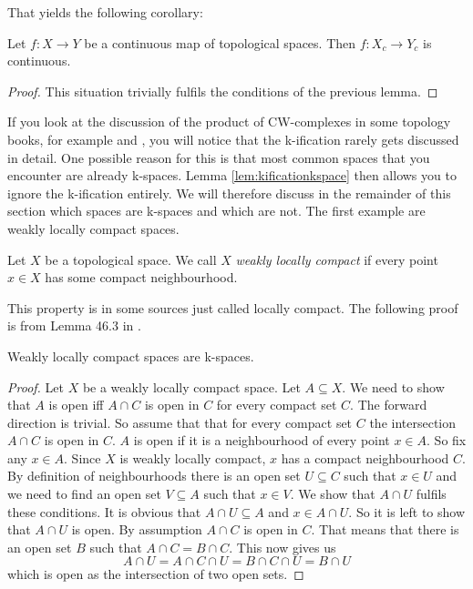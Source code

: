 That yields the following corollary: 

\begin{cor}
    Let $f \colon X \to Y$ be a continuous map of topological spaces.
    Then $f \colon X_c \to Y_c$ is continuous.
\end{cor}
\begin{proof}
    This situation trivially fulfils the conditions of the previous lemma.
\end{proof}

If you look at the discussion of the product of CW-complexes in some topology books, for example \cite{Hatcher2001} and \cite{Lück2005}, you will notice that the k-ification rarely gets discussed in detail. 
One possible reason for this is that most common spaces that you encounter are already k-spaces.
Lemma \ref{lem:kificationkspace} then allows you to ignore the k-ification entirely. 
We will therefore discuss in the remainder of this section which spaces are k-spaces and which are not.
The first example are weakly locally compact spaces.

\begin{defi}
    Let $X$ be a topological space.
    We call $X$ \emph{weakly locally compact} if every point $x \in X$ has some compact neighbourhood.
\end{defi}

This property is in some sources just called locally compact.
The following proof is from Lemma 46.3 in \cite{Munkres2014}.

\begin{lem}
    Weakly locally compact spaces are k-spaces.
\end{lem}
\begin{proof}
    Let $X$ be a weakly locally compact space. 
    Let $A \subseteq X$.
    We need to show that $A$ is open iff $A \cap C$ is open in $C$ for every compact set $C$.
    The forward direction is trivial. 
    So assume that that for every compact set $C$ the intersection $A \cap C$ is open in $C$.
    $A$ is open if it is a neighbourhood of every point $x \in A$.
    So fix any $x \in A$.
    Since $X$ is weakly locally compact, $x$ has a compact neighbourhood $C$.
    By definition of neighbourhoods there is an open set $U \subseteq C$ such that $x \in U$ and we need to find an open set $V \subseteq A$ such that $x \in V$.
    We show that $A \cap U$ fulfils these conditions. 
    It is obvious that $A \cap U \subseteq A$ and $x \in A \cap U$. 
    So it is left to show that $A \cap U$ is open.
    By assumption $A \cap C$ is open in $C$. 
    That means that there is an open set $B$ such that $A \cap C = B \cap C$. 
    This now gives us 
    \[A \cap U = A \cap C \cap U = B \cap C \cap U = B \cap U\]
    which is open as the intersection of two open sets. 
\end{proof}

